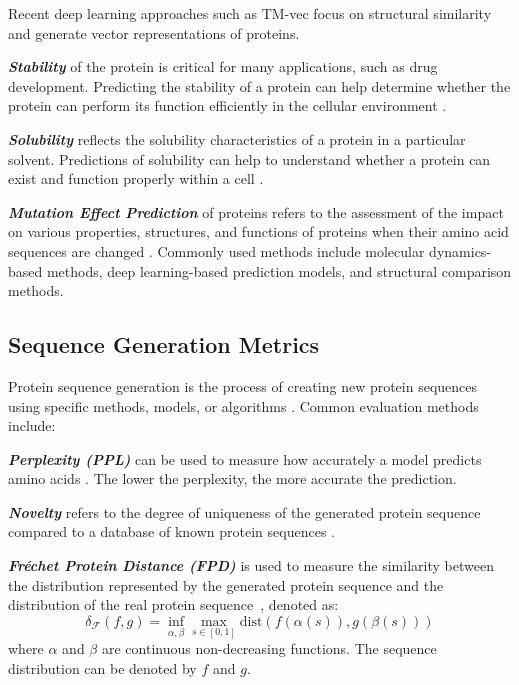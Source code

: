 Recent deep learning approaches such as TM-vec \cite{hamamsy2024protein} focus on structural similarity and generate vector representations of proteins.

\smallskip\noindent \textit{\textbf{Stability}} of the protein is critical for many applications, such as drug development. Predicting the stability of a protein can help determine whether the protein can perform its function efficiently in the cellular environment \cite{cheng2006prediction}.

\smallskip\noindent \textit{\textbf{Solubility}} reflects the solubility characteristics of a protein in a particular solvent. Predictions of solubility can help to understand whether a protein can exist and function properly within a cell \cite{hebditch2017protein}.

\smallskip\noindent \textit{\textbf{Mutation Effect Prediction}} of proteins refers to the assessment of the impact on various properties, structures, and functions of proteins when their amino acid sequences are changed \cite{mansoor2022accurate}. Commonly used methods include molecular dynamics-based methods, deep learning-based prediction models, and structural comparison methods.

\subsection{Sequence Generation Metrics} 
Protein sequence generation is the process of creating new protein sequences using specific methods, models, or algorithms \cite{anand2022protein}. Common evaluation methods include:

\smallskip\noindent \textit{\textbf{Perplexity (PPL)}} can be used to measure how accurately a model predicts amino acids \cite{hesslow2022rita}. The lower the perplexity, the more accurate the prediction.

\smallskip\noindent \textit{\textbf{Novelty}} refers to the degree of uniqueness of the generated protein sequence compared to a database of known protein sequences \cite{truong2023poet}.

\smallskip\noindent \textit{\textbf{Fr\'echet Protein Distance (FPD)}} is used to measure the similarity between the distribution represented by the generated protein sequence and the distribution of the real protein sequence~\citep{jiang2008protein}, denoted as: 
\begin{equation}
\delta_{\mathcal{F}}(f, g) = \inf_{\alpha, \beta} \max_{s \in [0,1]} \text{dist}(f(\alpha(s)), g(\beta(s)))
\end{equation}
where $\alpha$ and $\beta$ are continuous non-decreasing functions. The sequence distribution can be denoted by $f$ and $g$.

